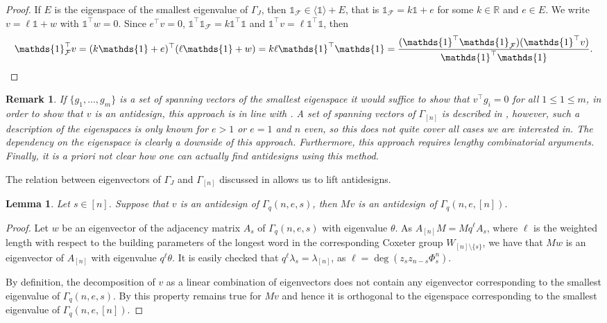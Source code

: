 \documentclass[11pt]{article}
\newtheorem{lemma}[thm]{Lemma}
\newtheorem{remark}[thm]{Remark}
\newcommand{\allones}{\mathds{1}}
\newcommand{\charvec}{\mathds{1}}
\newcommand{\EKR}{\mathcal{F}}
\renewcommand{\le}{\leqslant}
\begin{document}
\begin{proof}
If $E$ is the eigenspace of the smallest eigenvalue of $\Gamma_{J}$, then $\charvec_\EKR\in\langle \allones \rangle+E$, that is $\charvec_\EKR=k\allones+e$ for some $k\in\mathbb{R}$ and $e\in E$. We write $v=\ell \allones+w$ with $\allones^\top w=0$. Since $e^\top v=0$, $\allones^\top \charvec_\EKR=k\allones^\top \allones$ and $\allones^\top v=\ell \allones^\top \allones$, then
\begin{align*}
\charvec_\EKR^\top v =(k\allones+e)^\top(\ell \allones+w)=k\ell \allones^\top \allones =\frac{(\allones^\top\charvec_\EKR)(\allones^\top v)}{\allones^\top \allones}.
\qedhere
\end{align*}
\end{proof}


\begin{remark}
If $\{g_1,\ldots,g_m\}$ is a set of spanning vectors of the smallest eigenspace it would suffice to show that $v^\top g_i=0$ for all $1\le 1\le m$, in order to show that $v$ is an antidesign, this approach is in line with \cite{klaus_jesse_philipp}. A set of spanning vectors of $\Gamma_{[n]}$ is described in \cite{AlgebraicApproach2}, however, such a description of the eigenspaces is only known for $e>1$ or $e=1$ and $n$ even, so this does not quite cover all cases we are interested in. The dependency on the eigenspace is clearly a downside of this approach. Furthermore, this approach requires lengthy combinatorial arguments. Finally, it is a priori not clear how one can actually find antidesigns using this method.
\end{remark}

The relation between eigenvectors of $\Gamma_J$ and $\Gamma_{[n]}$ discussed in  allows us to lift antidesigns.

\begin{lemma}\label{lem:transferantidesign}
    Let $s \in [n]$. Suppose that $v$ is an antidesign of $\Gamma_q(n,e,s)$, then $Mv$ is an antidesign of $\Gamma_q(n,e,[n])$.
\end{lemma}
\begin{proof}
Let $w$ be an eigenvector of the adjacency matrix $A_s$ of $\Gamma_q(n,e,s)$ with eigenvalue $\theta$. As $A_{[n]}M=Mq^\ell A_s$, where $\ell$ is the weighted length with respect to the building parameters of the longest word in the corresponding Coxeter group $W_{[n]\setminus\{s\}}$, we have that $Mw$ is an eigenvector of $A_{[n]}$ with eigenvalue $q^\ell\theta$. It is easily checked that $q^\ell \lambda_s=\lambda_{[n]}$, as $\ell=\deg(z_sz_{n-s}\Phi_s^n)$.

    By definition, the decomposition of $v$ as a linear combination of eigenvectors does not contain any eigenvector corresponding to the smallest eigenvalue of $\Gamma_q(n,e,s)$. By  this property remains true for $Mv$ and hence it is orthogonal to the eigenspace corresponding to the smallest eigenvalue of $\Gamma_q(n,e,[n])$.
\end{proof}
\end{document}
